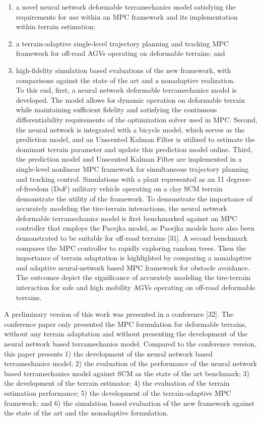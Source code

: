 \documentclass[10pt]{article}
\begin{document}
\begin{enumerate}
  \item a novel neural network deformable terramechanics model satisfying the requirements for use within an MPC framework and its implementation within terrain estimation;
  \item a terrain-adaptive single-level trajectory planning and tracking MPC framework for off-road AGVs operating on deformable terrains; and
  \item high-fidelity simulation based evaluations of the new framework, with comparisons against the state of the art and a nonadaptive realization.\\[0pt]
To this end, first, a neural network deformable terramechanics model is developed. The model allows for dynamic operation on deformable terrain while maintaining sufficient fidelity and satisfying the continuous differentiability requirements of the optimization solver used in MPC. Second, the neural network is integrated with a bicycle model, which serves as the prediction model, and an Unscented Kalman Filter is utilized to estimate the dominant terrain parameter and update this prediction model online. Third, the prediction model and Unscented Kalman Filter are implemented in a single-level nonlinear MPC framework for simultaneous trajectory planning and tracking control. Simulations with a plant represented as an 11 degrees-of-freedom (DoF) military vehicle operating on a clay SCM terrain demonstrate the utility of the framework. To demonstrate the importance of accurately modeling the tire-terrain interactions, the neural network deformable terramechanics model is first benchmarked against an MPC controller that employs the Pacejka model, as Pacejka models have also been demonstrated to be suitable for off-road terrains [31]. A second benchmark compares the MPC controller to rapidly exploring random trees. Then the importance of terrain adaptation is highlighted by comparing a nonadaptive and adaptive neural-network based MPC framework for obstacle avoidance. The outcomes depict the significance of accurately modeling the tire-terrain interaction for safe and high mobility AGVs operating on off-road deformable terrains.
\end{enumerate}

A preliminary version of this work was presented in a conference [32]. The conference paper only presented the MPC formulation for deformable terrains, without any terrain adaptation and without presenting the development of the neural network based terramechanics model. Compared to the conference version, this paper presents 1) the development of the neural network based terramechanics model; 2) the evaluation of the performance of the neural network based terramechanics model against SCM as the state of the art benchmark; 3) the development of the terrain estimator; 4) the evaluation of the terrain estimation performance; 5) the development of the terrain-adaptive MPC framework; and 6) the simulation based evaluation of the new framework against the state of the art and the nonadaptive formulation.
\end{document}
